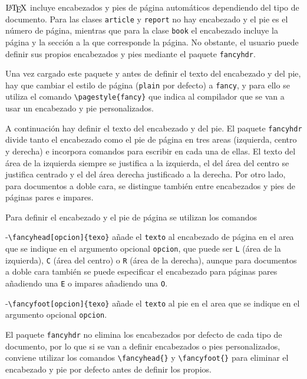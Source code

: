 \documentclass[
  a4paper,
]{scrreport}
\begin{document}
\(\text{\LaTeX}\) incluye encabezados y pies de página automáticos
dependiendo del tipo de documento. Para las clases \texttt{article} y
\texttt{report} no hay encabezado y el pie es el número de página,
mientras que para la clase \texttt{book} el encabezado incluye la página
y la sección a la que corresponde la página. No obstante, el usuario
puede definir sus propios encabezados y pies mediante el paquete
\texttt{fancyhdr}.

Una vez cargado este paquete y antes de definir el texto del encabezado
y del pie, hay que cambiar el estilo de página (\texttt{plain} por
defecto) a \texttt{fancy}, y para ello se utiliza el comando
\texttt{\textbackslash{}pagestyle\{fancy\}} que indica al compilador que
se van a usar un encabezado y pie personalizados.

A continuación hay definir el texto del encabezado y del pie. El paquete
\texttt{fancyhdr} divide tanto el encabezado como el pie de página en
tres areas (izquierda, centro y derecha) e incorpora comandos para
escribir en cada una de ellas. El texto del área de la izquierda siempre
se justifica a la izquierda, el del área del centro se justifica
centrado y el del área derecha justificado a la derecha. Por otro lado,
para documentos a doble cara, se distingue también entre encabezados y
pies de páginas pares e impares.

Para definir el encabezado y el pie de página se utilizan los comandos

-\texttt{\textbackslash{}fancyhead{[}opcion{]}\{texo\}} añade el
\texttt{texto} al encabezado de página en el area que se indique en el
argumento opcional \texttt{opcion}, que puede ser \texttt{L} (área de la
izquierda), \texttt{C} (área del centro) o \texttt{R} (área de la
derecha), aunque para documentos a doble cara también se puede
especificar el encabezado para páginas pares añadiendo una \texttt{E} o
impares añadiendo una \texttt{O}.

-\texttt{\textbackslash{}fancyfoot{[}opcion{]}\{texo\}} añade el
\texttt{texto} al pie en el area que se indique en el argumento opcional
\texttt{opcion}.

\begin{tcolorbox}[enhanced jigsaw, bottomrule=.15mm, leftrule=.75mm, opacityback=0, titlerule=0mm, bottomtitle=1mm, colbacktitle=quarto-callout-warning-color!10!white, arc=.35mm, toprule=.15mm, colframe=quarto-callout-warning-color-frame, title=\textcolor{quarto-callout-warning-color}{\faExclamationTriangle}\hspace{0.5em}{Advertencia}, coltitle=black, colback=white, breakable, toptitle=1mm, rightrule=.15mm, left=2mm, opacitybacktitle=0.6]

El paquete \texttt{fancyhdr} no elimina los encabezados por defecto de
cada tipo de documento, por lo que si se van a definir encabezados o
pies personalizados, conviene utilizar los comandos
\texttt{\textbackslash{}fancyhead\{\}} y
\texttt{\textbackslash{}fancyfoot\{\}} para eliminar el encabezado y pie
por defecto antes de definir los propios.

\end{tcolorbox}
\end{document}
